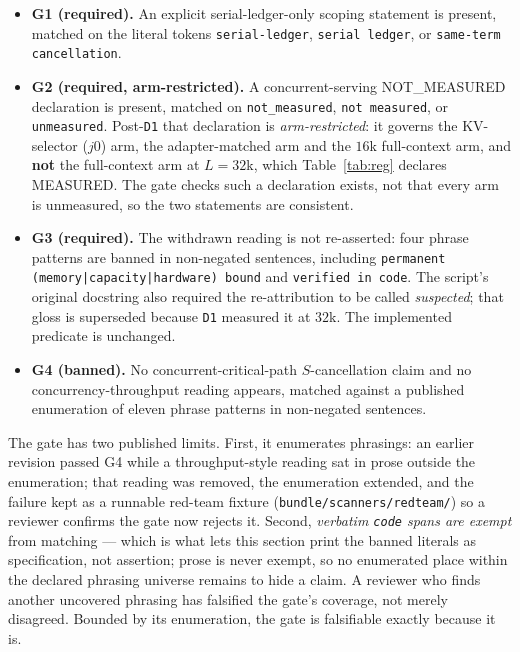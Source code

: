 \documentclass{article}
\newcommand{\code}[1]{\texttt{#1}}
\begin{document}
\begin{itemize}\itemsep0pt\parskip0pt
  \item \textbf{G1 (required).} An explicit serial-ledger-only scoping statement is present,
        matched on the literal tokens \code{serial-ledger}, \code{serial ledger}, or
        \code{same-term cancellation}.
  \item \textbf{G2 (required, arm-restricted).} A concurrent-serving NOT\_MEASURED declaration
        is present, matched on \code{not\_measured}, \code{not measured}, or
        \code{unmeasured}. Post-\texttt{D1} that declaration is \emph{arm-restricted}: it governs
        the KV-selector ($j0$) arm, the adapter-matched arm and the $16$k full-context arm, and
        \textbf{not} the full-context arm at $L{=}32$k, which Table~\ref{tab:reg} declares
        MEASURED. The gate checks such a declaration exists, not that every arm is unmeasured, so
        the two statements are consistent.
  \item \textbf{G3 (required).} The withdrawn reading is not re-asserted: four phrase patterns
        are banned in non-negated sentences, including
        \code{permanent (memory|capacity|hardware) bound} and \code{verified in code}. The
        script's original docstring also required the re-attribution to be called
        \emph{suspected}; that gloss is superseded because \texttt{D1} measured it at $32$k. The
        implemented predicate is unchanged.
  \item \textbf{G4 (banned).} No concurrent-critical-path $S$-cancellation claim and no
        concurrency-throughput reading appears, matched against a published enumeration of
        eleven phrase patterns in non-negated sentences.
\end{itemize}

The gate has two published limits. First, it enumerates phrasings: an earlier revision passed
G4 while a throughput-style reading sat in prose outside the enumeration; that reading was
removed, the enumeration extended, and the failure kept as a runnable red-team fixture
(\code{bundle/scanners/redteam/}) so a reviewer confirms the gate now rejects it. Second,
\emph{verbatim \code{code} spans are exempt} from matching --- which is what lets this section
print the banned literals as specification, not assertion; prose is never exempt, so no enumerated
place within the declared phrasing universe remains to hide a claim. A reviewer who finds another
uncovered phrasing has falsified the gate's coverage, not merely disagreed. Bounded by its
enumeration, the gate is falsifiable exactly because it is.
\end{document}
